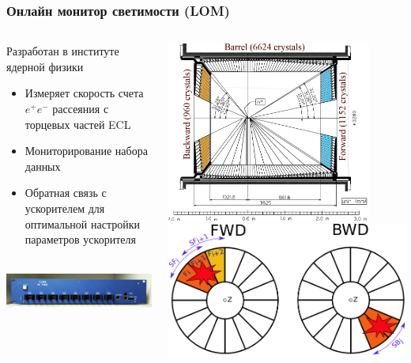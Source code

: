 \documentclass{beamer}
\begin{document}
\begin{frame}
\frametitle{Онлайн монитор светимости (LOM)}
\begin{columns}
  \begin{column}{0.6\textwidth}
  Разработан в институте ядерной физики
    \begin{itemize}
      \item Измеряет скорость счета $e^+e^-$ рассеяния с торцевых частей ECL
      \item Мониторирование набора данных
      \item Обратная связь с ускорителем для оптимальной настройки параметров ускорителя
      \\~\\
    \end{itemize}
    \includegraphics[width=\textwidth]{LOM_picture}
  \end{column}
  \begin{column}{0.4\textwidth}
  \includegraphics[width=0.85\textwidth, height=0.4\textheight]{ecl_color.png}
  \includegraphics[width=\textwidth, height=0.3\textheight]{lom_sectors.png}
  \end{column}
\end{columns}
\end{frame}
\end{document}
